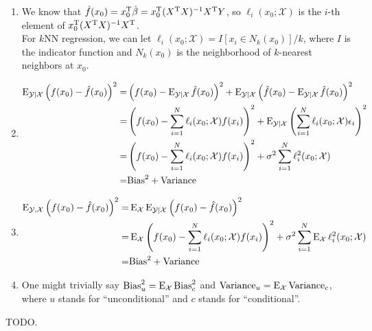 \begin{sol}
\begin{enumerate}[label={(\alph*)}]
\item 
We know that $\hat{f}(x_0)=x_0^{\mathrm{T}}\hat{\beta}=x_0^{\mathrm{T}}(X^{\mathrm{T}}X)^{-1}X^{\mathrm{T}}Y$, so $\ell_i(x_0;\mathcal{X})$ is the $i$-th element of $x_0^{\mathrm{T}}(X^{\mathrm{T}}X)^{-1}X^{\mathrm{T}}$.\\
For $k$NN regression, we can let $\ell_i(x_0;\mathcal{X})=I[x_i\in N_k(x_0)]/k$, where $I$ is the indicator function and $N_k(x_0)$ is the neighborhood of $k$-nearest neighbors at $x_0$.

\item
\begin{align*}
\operatorname{E}_{\mathcal{Y}\vert\mathcal{X}}\left(f(x_0)-\hat{f}(x_0)\right)^2 =& \left(f(x_0)-\operatorname{E}_{\mathcal{Y}\vert\mathcal{X}}\hat{f}(x_0)\right)^2+\operatorname{E}_{\mathcal{Y}\vert\mathcal{X}}\left(\hat{f}(x_0)-\operatorname{E}_{\mathcal{Y}\vert\mathcal{X}}\hat{f}(x_0)\right)^2 \\
=& \left(f(x_0)-\sum_{i=1}^N\ell_i(x_0;\mathcal{X})f(x_i)\right)^2 + \operatorname{E}_{\mathcal{Y}\vert\mathcal{X}}\left(\sum_{i=1}^N\ell_i(x_0;\mathcal{X})\epsilon_i\right)^2 \\
=& \left(f(x_0)-\sum_{i=1}^N\ell_i(x_0;\mathcal{X})f(x_i)\right)^2 + \sigma^2\sum_{i=1}^N\ell_i^2(x_0;\mathcal{X})\\
=& \mathrm{Bias}^2+\mathrm{Variance}
\end{align*}

\item
\begin{align*}
\operatorname{E}_{\mathcal{Y},\mathcal{X}}\left(f(x_0)-\hat{f}(x_0)\right)^2 =& \operatorname{E}_{\mathcal{X}}\operatorname{E}_{\mathcal{Y}\vert\mathcal{X}}\left(f(x_0)-\hat{f}(x_0)\right)^2 \\
=& \operatorname{E}_{\mathcal{X}}\left(f(x_0)-\sum_{i=1}^N\ell_i(x_0;\mathcal{X})f(x_i)\right)^2 + \sigma^2 \sum_{i=1}^N\operatorname{E}_{\mathcal{X}}\ell_i^2(x_0;\mathcal{X}) \\
=& \mathrm{Bias}^2+\mathrm{Variance}
\end{align*}
\item One might trivially say $\mathrm{Bias}^2_{u}=\operatorname{E}_\mathcal{X}\mathrm{Bias}^2_{c}$ and $\mathrm{Variance}_{u}=\operatorname{E}_\mathcal{X}\mathrm{Variance}_{c}$, where $u$ stands for ``unconditional'' and $c$ stands for ``conditional''.
\end{enumerate}
\end{sol}

\begin{sol}
TODO.
\end{sol}

